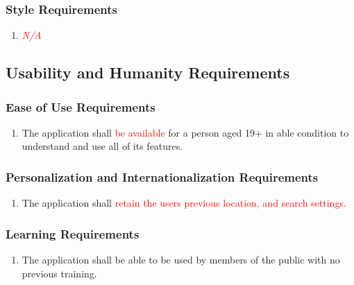 \documentclass[]{article}
\begin{document}
\subsubsection{Style Requirements}
\label{ssub:style_requirements}
\begin{enumerate}[{LF}1. ]
	\item \textcolor{red}{\emph{N/A}}
\end{enumerate}


\subsection{Usability and Humanity Requirements}
\label{sub:usability_and_humanity_requirements}

\subsubsection{Ease of Use Requirements}
\label{ssub:ease_of_use_requirements}
\begin{enumerate}[{UH}1. ]
	\item The application shall \textcolor{red}{be available} for a person aged 19+ in able condition to understand and use all of its features.
\end{enumerate}

\subsubsection{Personalization and Internationalization Requirements}
\label{ssub:personalization_and_internationalization_requirements}
\begin{enumerate}[{UH}1. ]
	\item The application shall \textcolor{red}{retain the users previous location, and search settings.}
\end{enumerate}

\subsubsection{Learning Requirements}
\label{ssub:learning_requirements}
\begin{enumerate}[{UH}1. ]
	\item The application shall be able to be used by members of the public with no previous training.
\end{enumerate}
\end{document}
